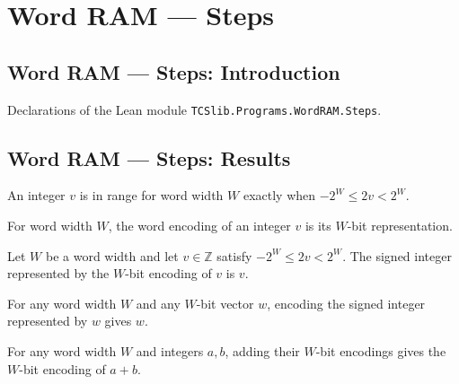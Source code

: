 \section{Word RAM --- Steps}
\subsection*{Word RAM --- Steps: Introduction}

Declarations of the Lean module \texttt{TCSlib.Programs.WordRAM.Steps}.

\subsection*{Word RAM --- Steps: Results}

\begin{definition}
\label{WordRAM.InRange}
\leanok
An integer $v$ is in range for word width $W$ exactly when $-2^W\le 2v<2^W$.
\end{definition}

\begin{definition}
\label{WordRAM.wd}
\leanok
For word width $W$, the word encoding of an integer $v$ is its $W$-bit representation.
\end{definition}

\begin{theorem}
\label{WordRAM.toInt_wd}
\leanok
{}
Let $W$ be a word width and let $v\in\mathbb{Z}$ satisfy $-2^W\le 2v<2^W$. The signed
integer represented by the $W$-bit encoding of $v$ is $v$.
\end{theorem}

\begin{theorem}
\label{WordRAM.wd_toInt}
\leanok
{}
For any word width $W$ and any $W$-bit vector $w$, encoding the signed integer
represented by $w$ gives $w$.
\end{theorem}

\begin{theorem}
\label{WordRAM.wd_add}
\leanok
{}
For any word width $W$ and integers $a,b$, adding their $W$-bit encodings gives the
$W$-bit encoding of $a+b$.
\end{theorem}

